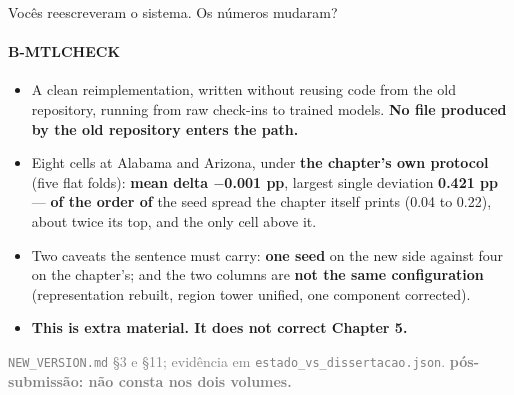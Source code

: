 \documentclass{beamer}
\begin{document}
\begin{frame}[noframenumbering]{Vocês reescreveram o sistema. Os números mudaram?}
    \framesubtitle{B-MTLCHECK}
    \hypertarget{bmtlcheck}{}
    \small
    \begin{itemize}\setlength{\itemsep}{0pt}\setlength{\parskip}{0pt}
        \item A clean reimplementation, written without reusing code from the old repository, running from raw check-ins to trained models. \textbf{No file produced by the old repository enters the path.}
        \item Eight cells at Alabama and Arizona, under \textbf{the chapter's own protocol} (five flat folds): \textbf{mean delta $-$0.001 pp}, largest single deviation \textbf{0.421 pp} --- \textbf{of the order of} the seed spread the chapter itself prints (0.04 to 0.22), about twice its top, and the only cell above it.
        \item Two caveats the sentence must carry: \textbf{one seed} on the new side against four on the chapter's; and the two columns are \textbf{not the same configuration} (representation rebuilt, region tower unified, one component corrected).
        \item \textcolor{alert}{\textbf{This is extra material. It does not correct Chapter 5.}}
    \end{itemize}
    \vfill
    {\scriptsize
    \begin{minipage}[b]{0.775\linewidth}\raggedright\textcolor{gray}{\texttt{NEW\_VERSION.md} §3 e §11; evidência em \texttt{estado\_vs\_dissertacao.json}. \textbf{pós-submissão: não consta nos dois volumes.}}\end{minipage}\hfill
    \begin{minipage}[b]{0.20\linewidth}\raggedleft \hyperlink{b0}{}\end{minipage}}
\end{frame}
\end{document}
